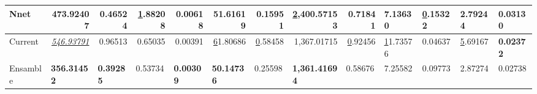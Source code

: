 \begin{table}[]
\begin{tabular}{@{}|l|r|r|r|r|r|r|r|r|l|l|l|l|@{}}
Nnet                                         & 473.92407                               & 0.46524                               & {\ul 1.88208}                & 0.00618                               & 51.61619                               & \textbf{0.15951}             & {\ul 2,400.57153}                         & 0.71841                      & \textbf{7.13630} & {\ul 0.15322}    & \textbf{2.79244} & 0.03130          \\ \midrule
Current                                      & {\ul \textit{546.93791}}                & 0.96513                               & 0.65035                      & 0.00391                               & {\ul 61.80686}                         & {\ul 0.58458}                & 1,367.01715                               & {\ul 0.92456}                & {\ul 11.73576}   & 0.04637          & {\ul 5.69167}    & \textbf{0.02372} \\ \midrule
Ensamble                                     & \multicolumn{1}{l|}{\textbf{356.31452}} & \multicolumn{1}{l|}{\textbf{0.39285}} & \multicolumn{1}{l|}{0.53734} & \multicolumn{1}{l|}{\textbf{0.00309}} & \multicolumn{1}{l|}{\textbf{50.14736}} & \multicolumn{1}{l|}{0.25598} & \multicolumn{1}{l|}{\textbf{1,361.41694}} & \multicolumn{1}{l|}{0.58676} & 7.25582          & 0.09773          & 2.87274          & 0.02738          \\ \bottomrule
\end{tabular}
\end{table}